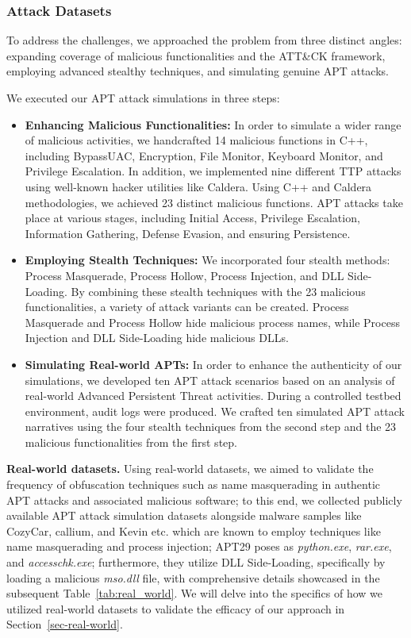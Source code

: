 \subsubsection{Attack Datasets}

To address the challenges, we approached the problem from three distinct angles: expanding coverage of malicious functionalities and the ATT\&CK framework, employing advanced stealthy techniques, and simulating genuine APT attacks.

We executed our APT attack simulations in three steps:
\begin{itemize}
    \item  \textbf{Enhancing Malicious Functionalities:} In order to simulate a wider range of malicious activities, we handcrafted 14 malicious functions in C++, including BypassUAC, Encryption, File Monitor, Keyboard Monitor, and Privilege Escalation. In addition, we implemented nine different TTP attacks using well-known hacker utilities like Caldera. Using C++ and Caldera methodologies, we achieved 23 distinct malicious functions. APT attacks take place at various stages, including Initial Access, Privilege Escalation, Information Gathering, Defense Evasion, and ensuring Persistence.
    \item \textbf{Employing Stealth Techniques:} We incorporated four stealth methods: Process Masquerade, Process Hollow, Process Injection, and DLL Side-Loading. By combining these stealth techniques with the 23 malicious functionalities, a variety of attack variants can be created. Process Masquerade and Process Hollow hide malicious process names, while Process Injection and DLL Side-Loading hide malicious DLLs.
    \item \textbf{Simulating Real-world APTs:} In order to enhance the authenticity of our simulations, we developed ten APT attack scenarios based on an analysis of real-world Advanced Persistent Threat activities. During a controlled testbed environment, audit logs were produced. We crafted ten simulated APT attack narratives using the four stealth techniques from the second step and the 23 malicious functionalities from the first step.
\end{itemize}

\noindent
{\bf Real-world datasets.} Using real-world datasets, we aimed to validate the frequency of obfuscation techniques such as name masquerading in authentic APT attacks and associated malicious software; to this end, we collected publicly available APT attack simulation datasets alongside malware samples like CozyCar,  callium, and Kevin etc. which are known to employ techniques like name masquerading and process injection;  APT29 poses as \textit{python.exe}, \textit{rar.exe}, and \textit{accesschk.exe}; furthermore, they utilize DLL Side-Loading, specifically by loading a malicious \textit{mso.dll} file, with comprehensive details showcased in the subsequent Table~\ref{tab:real_world}. We will delve into the specifics of how we utilized real-world datasets to validate the efficacy of our approach in Section~\ref{sec-real-world}.

